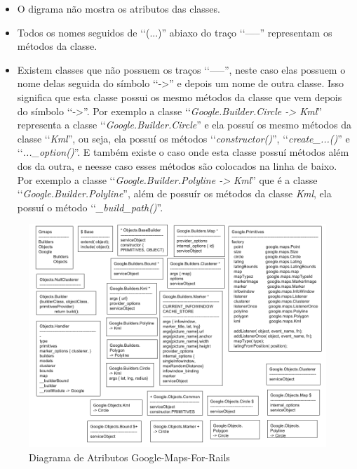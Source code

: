 \begin{itemize}

 \item O digrama não mostra os atributos das classes. 
 
 \item Todos os nomes seguidos de ‘‘(...)'' abiaxo do traço ‘‘-----'' representam os métodos da classe.
 
 \item Existem classes que não possuem os traços ‘‘-----'', neste caso elas possuem o nome delas
 seguida do símbolo ‘‘->'' e depois um nome de outra classe. Isso significa que esta classe
 possui os mesmo métodos da classe que vem depois do símbolo ‘‘->''. Por exemplo a 
 classe ‘‘\emph{Google.Builder.Circle -> Kml}'' representa a classe ‘‘\emph{Google.Builder.Circle}'' 
 e ela possuí os mesmo métodos da classe ‘‘\emph{Kml}'', ou seja, ela possuí os métodos
 ‘‘\emph{constructor()}'', ‘‘\emph{create\_...()}'' e ‘‘\emph{...\_option()}''. E também existe o caso 
 onde esta classe possuí métodos além dos da outra, e neesse caso esses métodos são colocados na linha 
 de baixo. Por exemplo a classe ‘‘\emph{Google.Builder.Polyline -> Kml}'' que é a classe 
 ‘‘\emph{Google.Builder.Polyline}'', além de possuír os métodos da classe \emph{Kml}, ela 
 possuí o método ‘‘\emph{\_build\_path()}''.
 
\end{itemize}

\begin{figure}[ht]
  \includegraphics[scale=0.48]{images/diagrama_de_atributos_google_maps_for_rails.png}
  \caption{Diagrama de Atributos Google-Maps-For-Rails}
  \label{fig:diagrama_de_atributos_google_maps_for_rails}
\end{figure}

